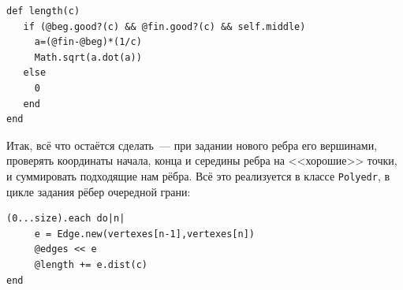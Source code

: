 \begin{lstlisting}
def length(c)
   if (@beg.good?(c) && @fin.good?(c) && self.middle)
     a=(@fin-@beg)*(1/c)
     Math.sqrt(a.dot(a))
   else
     0
   end
end 
\end{lstlisting}


Итак, всё что остаётся сделать~--- при задании нового ребра его вершинами, проверять координаты начала, конца и середины ребра на <<хорошие>> точки, и суммировать подходящие нам рёбра. Всё это реализуется в классе \verb|Polyedr|,  в цикле задания рёбер очередной грани:


\begin{lstlisting}
(0...size).each do|n| 
     e = Edge.new(vertexes[n-1],vertexes[n])
     @edges << e
     @length += e.dist(c)
end
\end{lstlisting}



